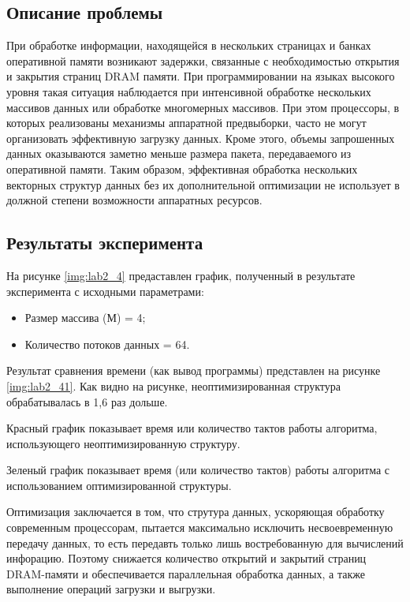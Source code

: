 \subsection*{Описание проблемы}
При обработке информации, находящейся в нескольких страницах и банках оперативной памяти возникают задержки, связанные с необходимостью открытия и закрытия страниц DRAM памяти. При программировании на языках высокого уровня такая ситуация наблюдается при интенсивной обработке нескольких массивов данных или обработке многомерных массивов. При этом процессоры, в которых реализованы механизмы аппаратной предвыборки, часто не могут организовать эффективную загрузку данных. Кроме этого, объемы запрошенных данных оказываются заметно меньше размера пакета, передаваемого из оперативной памяти. Таким образом, эффективная обработка нескольких векторных структур данных без их дополнительной оптимизации не использует в должной степени возможности аппаратных ресурсов. 

\subsection*{Результаты эксперимента}
На рисунке \ref{img:lab2_4} предаставлен график, полученный в результате эксперимента с исходными параметрами:
\begin{itemize}
	\item Размер массива (М) = 4;
	\item Количество потоков данных = 64.
\end{itemize}


Результат сравнения времени (как вывод программы) представлен на рисунке \ref{img:lab2_41}. Как видно на рисунке, неоптимизированная структура обрабатывалась в 1,6 раз дольше.


Красный график показывает время или количество тактов работы алгоритма, использующего неоптимизированную структуру.

Зеленый график показывает время (или количество тактов) работы алгоритма с использованием оптимизированной структуры.

Оптимизация заключается в том, что струтура данных, ускоряющая обработку современным процессорам, пытается максимально исключить несвоевременную передачу данных, то есть передавть только лишь востребованную для вычислений инфорацию. Поэтому снижается количество открытий и закрытий страниц DRAM-памяти и обеспечивается параллельная обработка данных, а также выполнение операций загрузки и выгрузки.


